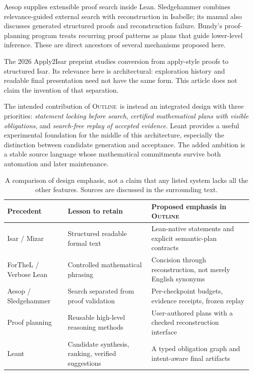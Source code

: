 \documentclass[11pt,a4paper]{article}
\newcommand{\Outline}{\textsc{Outline}}
\theoremstyle{definition}
\theoremstyle{remark}
\numberwithin{equation}{section}
\begin{document}
Aesop supplies extensible proof search inside Lean. Sledgehammer combines relevance-guided external search with reconstruction in Isabelle; its manual also discusses generated structured proofs and reconstruction failure. Bundy's proof-planning program treats recurring proof patterns as plans that guide lower-level inference. These are direct ancestors of several mechanisms proposed here.\cite{aesop,sledgehammer,bundy}

The 2026 Apply2Isar preprint studies conversion from apply-style proofs to structured Isar. Its relevance here is architectural: exploration history and readable final presentation need not have the same form. This article does not claim the invention of that separation.\cite{apply2isar}

The intended contribution of \Outline\ is instead an integrated design with three priorities: \emph{statement locking before search}, \emph{certified mathematical plans with visible obligations}, and \emph{search-free replay of accepted evidence}. Leant provides a useful experimental foundation for the middle of this architecture, especially the distinction between candidate generation and acceptance. The added ambition is a stable source language whose mathematical commitments survive both automation and later maintenance.

\begin{table}[htbp]
\centering\small
\begin{tabularx}{\linewidth}{@{}P{.22\linewidth}YY@{}}
\toprule
Precedent & Lesson to retain & Proposed emphasis in \Outline \\
\midrule
Isar / Mizar & Structured readable formal text & Lean-native statements and explicit semantic-plan contracts \\
ForTheL / Verbose Lean & Controlled mathematical phrasing & Concision through reconstruction, not merely English synonyms \\
Aesop / Sledgehammer & Search separated from proof validation & Per-checkpoint budgets, evidence receipts, frozen replay \\
Proof planning & Reusable high-level reasoning methods & User-authored plans with a checked reconstruction interface \\
Leant & Candidate synthesis, ranking, verified suggestions & A typed obligation graph and intent-aware final artifacts \\
\bottomrule
\end{tabularx}
\caption{A comparison of design emphasis, not a claim that any listed system lacks all the other features. Sources are discussed in the surrounding text.}
\end{table}
\end{document}
